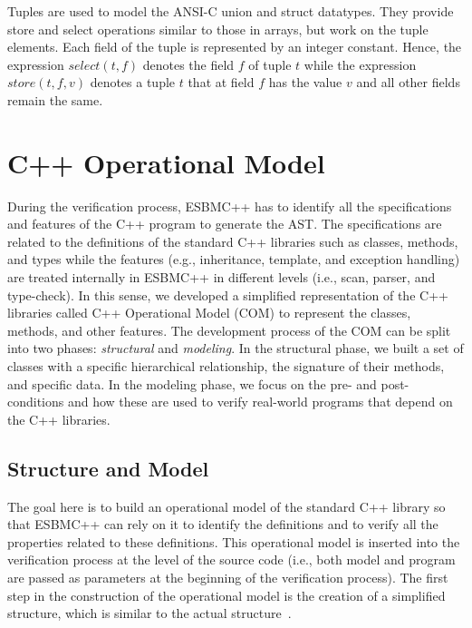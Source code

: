 \documentclass[a4paper]{llncs}
\begin{document}
\noindent
Tuples are used to model the ANSI-C union and struct datatypes. They provide
\mbox{store} and \mbox{select} operations similar to those in arrays, but work
on the tuple \mbox{elements}. Each field of the tuple is represented by an
integer constant. Hence, the expression $\mathit{select}(t, f)$ denotes the field $f$
of tuple $t$ while the expression $\mathit{store}(t, f, v)$ denotes a tuple $t$
that at field $f$ has the value $v$ and all other fields remain the
same.

\section{C++ Operational Model}

During the verification process, ESBMC++ has to identify all the
specifications and features of the C++ program to generate the AST.
The specifications are related to the definitions of the standard C++
libraries such as classes, methods, and types while the features
(e.g., inheritance, template, and exception handling) are treated internally
in ESBMC++ in different levels (i.e., scan, parser, and type-check).
In this sense, we developed a simplified representation of the C++ libraries
called C++ Operational Model (COM) to represent the classes, methods,
and other features. The development process of the COM can be split into
two phases: \textit{structural} and \textit{modeling}. In the structural phase,
we built a set of classes with a specific hierarchical relationship, the signature
of their methods, and specific data. In the modeling phase, we focus on the pre-
and post-conditions and how these are used to verify real-world programs that
depend on the C++ libraries.

\subsection{Structure and Model}

The goal here is to build an operational model of the standard C++ library
so that ESBMC++ can rely on it to identify the definitions and to verify all
the properties related to these definitions. This operational model is inserted
into the verification process at the level of the source code (i.e., both model and
program are passed as parameters at the beginning of the verification process).
The first step in the construction of the operational model is the creation
of a simplified structure, which is similar to the actual structure~\cite{CppReference12}.
\end{document}
